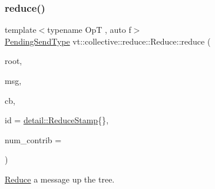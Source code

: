 \mbox{\label{structvt_1_1collective_1_1reduce_1_1_reduce_a715bd2de0a6af6294657cf684291228f}} 
\subsubsection{\texorpdfstring{reduce()}{reduce()}\hspace{0.1cm}{\footnotesize\ttfamily [7/10]}}
{\footnotesize\ttfamily template$<$typename OpT , auto f$>$ \\
\hyperlink{structvt_1_1collective_1_1reduce_1_1_reduce_a0474b491f3c93014d9a0ce0356c6bfd5}{Pending\+Send\+Type} vt\+::collective\+::reduce\+::\+Reduce\+::reduce (\begin{DoxyParamCaption}\item[{\hyperlink{namespacevt_a866da9d0efc19c0a1ce79e9e492f47e2}{Node\+Type} const \&}]{root,  }\item[{typename \hyperlink{structvt_1_1_func_traits}{Func\+Traits}$<$ decltype(f)$>$\+::MsgT $\ast$}]{msg,  }\item[{\hyperlink{namespacevt_a57b238783d05de96bc2c4027f7073b7f}{Callback}$<$ typename \hyperlink{structvt_1_1_func_traits}{Func\+Traits}$<$ decltype(f)$>$\+::MsgT $>$}]{cb,  }\item[{\hyperlink{namespacevt_1_1collective_1_1reduce_1_1detail_abcd205dec83706f347d55c7528bf2664}{detail\+::\+Reduce\+Stamp}}]{id = {\ttfamily \hyperlink{namespacevt_1_1collective_1_1reduce_1_1detail_abcd205dec83706f347d55c7528bf2664}{detail\+::\+Reduce\+Stamp}\{\}},  }\item[{\hyperlink{structvt_1_1collective_1_1reduce_1_1_reduce_a6c3e63aca10c31d2823b0b18cf9762a4}{Reduce\+Num\+Type} const \&}]{num\+\_\+contrib = {} }\end{DoxyParamCaption})\hspace{0.3cm}{\ttfamily [inline]}}



\hyperlink{structvt_1_1collective_1_1reduce_1_1_reduce}{Reduce} a message up the tree. 


